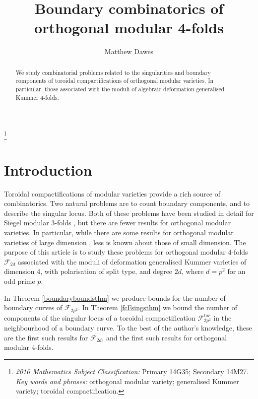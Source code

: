 \documentclass[11pt]{amsart}
\title{Boundary combinatorics of orthogonal modular 4-folds}
\author{Matthew Dawes}
\date{}
\newcommand{\fc}{\mathcal{F}}
\begin{document}
\maketitle 
\def\thefootnote{}
\footnote{\textit{2010 Mathematics Subject Classification:} 
Primary 14G35; Secondary 14M27. \\
\textit{Key words and phrases:}
orthogonal modular variety; generalised Kummer variety; toroidal compactification.}
\begin{abstract}
We study combinatorial problems related to the singularities and boundary components of toroidal compactifications of orthogonal modular varieties.
In particular, those associated with the moduli of algebraic deformation generalised Kummer 4-folds.
\end{abstract}
\section{Introduction}
Toroidal compactifications of modular varieties provide a rich source of combinatorics.
Two natural problems are to count boundary components, and to describe the singular locus.
Both of these problems have been studied in detail for Siegel modular 3-folds \cite{zbMATH00011135, zbMATH00520405}, but there are fewer results for orthogonal modular varieties.
In particular, while there are some results for orthogonal modular varieties of large dimension \cite{scattone}, less is known about those of small dimension.
The purpose of this article is to study these problems for orthogonal modular 4-folds $\fc_{2d}$ associated with the moduli of deformation generalised Kummer varieties of dimension 4, with polarisation of split type, and degree $2d$, where $d=p^2$ for an odd prime $p$.

In Theorem \ref{boundaryboundsthm} we produce bounds for the number of boundary curves of $\fc_{2p^2}$.
In Theorem \ref{fcFsingsthm} we bound the number of components of the singular locus of a toroidal compactification $\fc^{tor}_{2p^2}$ in the neighbourhood of a boundary curve.
To the best of the author's knowledge, these are the first such results for $\fc_{2d}$, and the first such results for orthogonal modular 4-folds.
\end{document}
